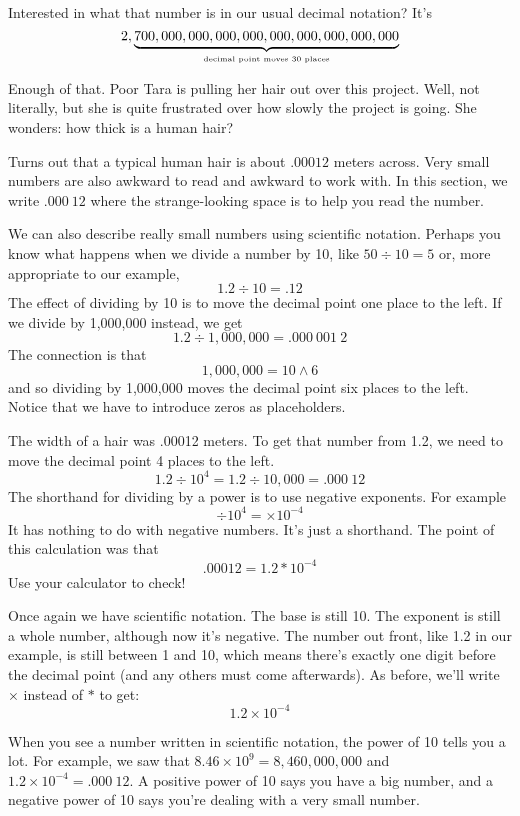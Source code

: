 Interested in what that number is in our usual decimal notation?  It's
$$2, \underbrace{ \hbox{$700,000,000,000,000,000,000,000,000,000 $}}_{\hbox{\begin{tiny} decimal point moves 30 places \end{tiny}}}$$

Enough of that. Poor Tara is pulling her hair out over this project.  Well, not literally, but she is quite frustrated over how slowly the project is going.  She wonders: how thick is a human hair?  

Turns out that a typical human hair is about $.00012$ meters across.  Very small numbers are also awkward to read and awkward to work with.  In this section, we write  $.000~12$ where the strange-looking space is to help you read the number.  
 
We can also describe really small numbers using scientific notation.  Perhaps you know what happens when we divide a number by 10, like
$ 50 \div 10 = 5$ or, more appropriate to our example, $$ 1.2 \div 10 = .12$$
The effect of dividing by 10 is to move the decimal point one place to the left.
If we divide by 1,000,000 instead, we get
$$ 1.2 \div 1,000,000 = .000~001~2 $$ 
The connection is that $$ 1,000,000 = 10 \wedge 6  $$
and so dividing by 1,000,000 moves the decimal point six places to the left.  Notice that we have to introduce zeros as placeholders.

The width of a hair was .00012 meters.  To get that number from 1.2, we need to move the decimal point 4 places to the left.  $$1.2 \div 10^4 = 1.2 \div 10,000 = .000~12$$
The shorthand for dividing by a power is to use negative exponents.  For example
$$ \div 10^4 = \times 10^{-4}$$
It has nothing to do with negative numbers.  It's just a shorthand.
The point of this calculation was that $$.00012= 1.2 \ast10^{-4}$$
Use your calculator to check!

Once again we have scientific notation.  The base is still 10.  The exponent is still a whole number, although now it's negative.  The number out front, like 1.2 in our example, is still between 1 and 10, which means there's exactly one digit before the decimal point (and any others must come afterwards).  As before, we'll write $\times$ instead of $\ast$ to get: $$1.2 \times 10^{-4}$$


When you see a number written in scientific notation, the power of 10 tells you a lot.  For example, we saw that $8.46 \times 10^ 9 = 8,460,000,000$ and $1.2 \times10^{-4} = .000~12 $.  A positive power of 10 says you have a big number, and a negative power of 10 says you're dealing with a very small number. 
\bigskip


